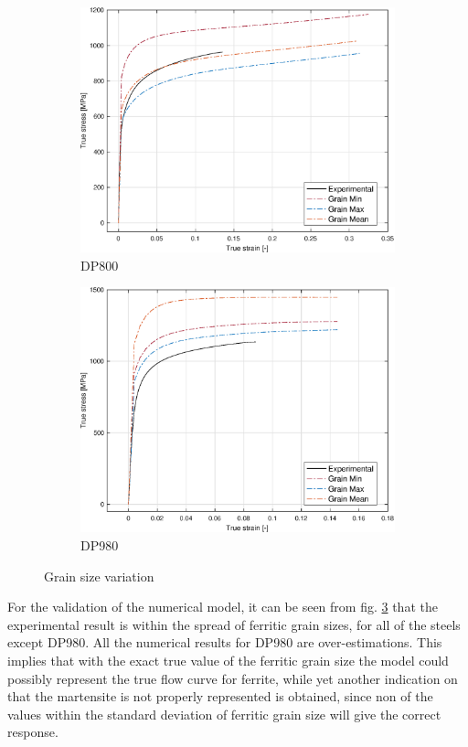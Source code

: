\documentclass{article}
\begin{document}
\begin{figure}[h!]
     \begin{subfigure}[b]{0.45\textwidth}
         \centering
         \includegraphics[width=\textwidth]{Grain800.eps}
         \caption{DP800}
         \label{fig:Grain800}
     \end{subfigure}
     \begin{subfigure}[b]{0.45\textwidth}
         \centering
         \includegraphics[width=\textwidth]{Grain980.eps}
         \caption{DP980}
         \label{fig:Grain980}
     \end{subfigure}
     \caption{Grain size variation}
     \label{fig:GrainVariation}
\end{figure}
For the validation of the numerical model, it can be seen from fig. \ref{fig:GrainVariation} that the experimental result is within the spread of ferritic grain sizes, for all of the steels except DP980. All the numerical results for DP980 are over-estimations. This implies that with the exact true value of the ferritic grain size the model could possibly represent the true flow curve for ferrite, while yet another indication on that the martensite is not properly represented is obtained, since non of the values within the standard deviation of ferritic grain size will give the correct response. 
\end{document}
